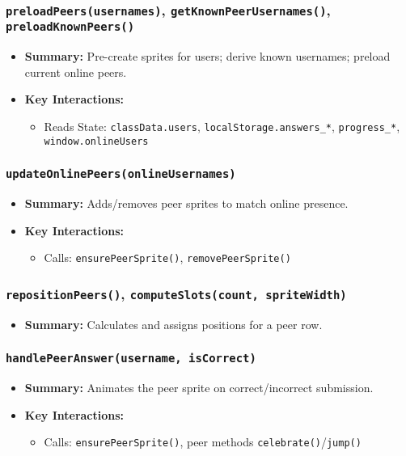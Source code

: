 \documentclass[11pt,letterpaper]{article}
\begin{document}
\subsubsection{\texttt{preloadPeers(usernames)}, \texttt{getKnownPeerUsernames()}, \texttt{preloadKnownPeers()}}
\begin{itemize}
    \item \textbf{Summary:} Pre-create sprites for users; derive known usernames; preload current online peers.
    \item \textbf{Key Interactions:}
    \begin{itemize}
        \item Reads State: \texttt{classData.users}, \texttt{localStorage.answers\_*}, \texttt{progress\_*}, \texttt{window.onlineUsers}
    \end{itemize}
\end{itemize}

\subsubsection{\texttt{updateOnlinePeers(onlineUsernames)}}
\begin{itemize}
    \item \textbf{Summary:} Adds/removes peer sprites to match online presence.
    \item \textbf{Key Interactions:}
    \begin{itemize}
        \item Calls: \texttt{ensurePeerSprite()}, \texttt{removePeerSprite()}
    \end{itemize}
\end{itemize}

\subsubsection{\texttt{repositionPeers()}, \texttt{computeSlots(count, spriteWidth)}}
\begin{itemize}
    \item \textbf{Summary:} Calculates and assigns positions for a peer row.
\end{itemize}

\subsubsection{\texttt{handlePeerAnswer(username, isCorrect)}}
\begin{itemize}
    \item \textbf{Summary:} Animates the peer sprite on correct/incorrect submission.
    \item \textbf{Key Interactions:}
    \begin{itemize}
        \item Calls: \texttt{ensurePeerSprite()}, peer methods \texttt{celebrate()}/\texttt{jump()}
    \end{itemize}
\end{itemize}
\end{document}
